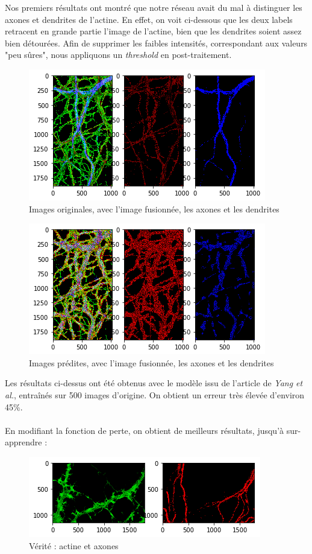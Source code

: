 \documentclass{report}
\begin{document}
Nos premiers résultats ont montré que notre réseau avait du mal à distinguer
les axones et dendrites de l'actine. En effet, on voit ci-dessous que les deux labels
retracent en grande partie l'image de l'actine, bien que les dendrites soient assez
bien détourées. Afin de supprimer les faibles intensités, correspondant aux valeurs
"peu sûres", nous appliquons un \textit{threshold} en post-traitement.

\begin{figure}[H]
\centering
\includegraphics[scale=0.5]{"truth"}
\caption{Images originales, avec l'image fusionnée, les axones et les dendrites}
\end{figure}

\begin{figure}[H]
\centering
\includegraphics[scale=0.5]{"result"}
\caption{Images prédites, avec l'image fusionnée, les axones et les dendrites}
\end{figure}

Les résultats ci-dessus ont été obtenus avec le modèle issu de l'article de
\textit{Yang et al.}, entraînés sur 500 images d'origine. On obtient un erreur
très élevée d'environ 45\%. \\ \\
En modifiant la fonction de perte, on obtient de meilleurs résultats, jusqu'à
sur-apprendre :

\begin{figure}[H]
\centering
\includegraphics[scale=0.5]{"result_overfit_truth"}
\caption{Vérité : actine et axones}
\end{figure}
\end{document}
